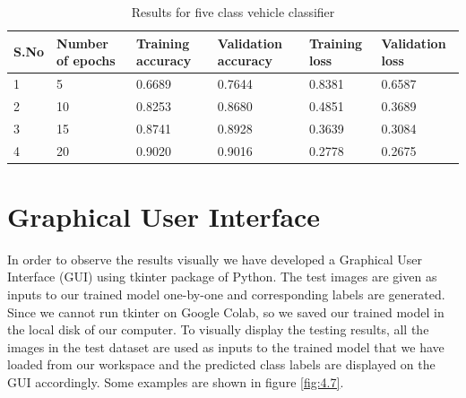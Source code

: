 \begin{table}[H]
    \caption{Results for five class vehicle classifier}
    \label{table:4.2}
	  \begin{center}
		\scalebox{0.85}
		{\begin{tabular}{|l |l |l |l |l |l |}
		\hline
		S.No & Number of epochs & Training accuracy & Validation accuracy & Training loss & Validation loss\\ \hline
		1  & 5 & 0.6689 & 0.7644 & 0.8381 & 0.6587
		\\ \hline
		2  & 10 & 0.8253 & 0.8680 & 0.4851 & 0.3689
        \\ \hline %
        3   & 15 &  0.8741 & 0.8928  &0.3639  & 0.3084
        \\ \hline %
        4   & 20 &  0.9020 & 0.9016  &0.2778  & 0.2675
        \\ \hline %
		\end{tabular}}
	  \end{center}
\end{table}

\section{Graphical User Interface}
In order to observe the results visually we have developed a Graphical User
Interface (GUI) using tkinter package of 
Python. The test images are given as inputs to our trained
model one-by-one and corresponding labels are generated.
Since we cannot run tkinter on Google Colab,
so we saved our trained model in the local disk of our computer.
To visually display the testing results, all the images in the test dataset are used as inputs to the trained model that we have loaded  from our workspace
and the predicted class labels are displayed on the GUI accordingly.
Some examples are shown in
figure \ref{fig:4.7}.

